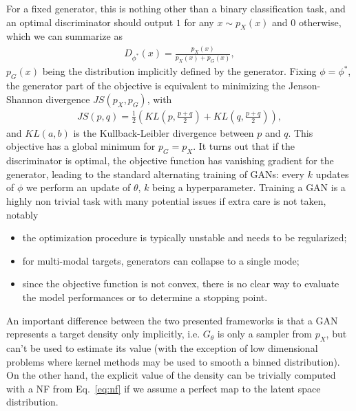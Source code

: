 %
For a fixed generator, this is nothing other than a binary classification task, and an optimal discriminator should output $1$ for any $x \sim p_{X}(x)$ and $0$ otherwise, which we can summarize as
%
\begin{align}
D_{\phi^{*}}(x) = \frac{p_{X}(x)}{p_{X}(x) + p_{G}(x)},
\end{align}
%
$p_{G}(x)$ being the distribution implicitly defined by the generator. 
Fixing $\phi = \phi^{*}$, the generator part of the objective is equivalent to minimizing the Jenson-Shannon divergence $JS(p_{X}, p_{G})$, with
%
\begin{align}
JS\left(p, q\right) = \frac{1}{2} \left(KL\left(p, \frac{p + q}{2}\right) + KL\left(q, \frac{p + q}{2}\right) \right),
\end{align}
%
and $KL(a, b)$ is the Kullback-Leibler divergence between $p$ and $q$. This objective has a global minimum for $p_{G} = p_{X}$.
It turns out that if the discriminator is optimal, the objective function has vanishing gradient for the generator, leading to the standard alternating training of GANs: every $k$ updates of $\phi$ we perform an update of $\theta$, $k$ being a hyperparameter.
Training a GAN is a highly non trivial task with many potential issues if extra care is not taken, notably
\begin{itemize}
\item
the optimization procedure is typically unstable and needs to be regularized;
\item
for multi-modal targets, generators can collapse to a single mode;
\item
since the objective function is not convex, there is no clear way to evaluate the model performances or to determine a stopping point.
\end{itemize}

An important difference between the two presented frameworks is that a GAN represents a target density only implicitly, i.e. $G_{\theta}$ is only a sampler from $p_{X}$, but can't be used to estimate its value (with the exception of low dimensional problems where kernel methods may be used to smooth a binned distribution). On the other hand, the explicit value of the density can be trivially computed with a NF from Eq.~\ref{eq:nf} if we assume a perfect map to the latent space distribution.

